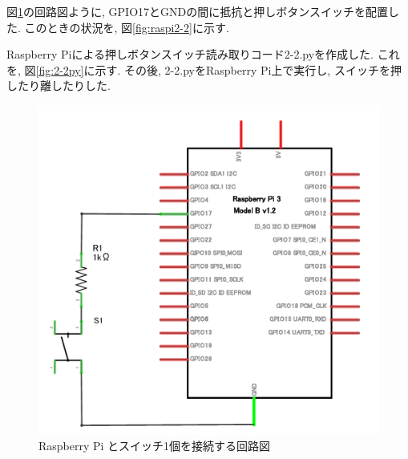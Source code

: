 \documentclass{ltjsarticle} %
\begin{document}
図\ref{fig:fig2-2}の回路図ように, GPIO17とGNDの間に抵抗と押しボタンスイッチを配置した.
このときの状況を, 図\ref{fig:raspi2-2}に示す.

Raspberry Piによる押しボタンスイッチ読み取りコード2-2.pyを作成した. これを, 図\ref{fig:2-2py}に示す.
その後, 2-2.pyをRaspberry Pi上で実行し, スイッチを押したり離したりした.   

\begin{figure}[H] %
  \centering
  \begin{minipage}{0.45\textwidth} %
    \centering
    \includegraphics[width=\textwidth]{fig2-2.png} %
    \caption{Raspberry Pi とスイッチ1個を接続する回路図} %
    \label{fig:fig2-2} %
  \end{minipage}
  \hfill %
  \begin{minipage}{0.45\textwidth} %
    \centering

\end{minipage}
\end{figure}
\end{document}
